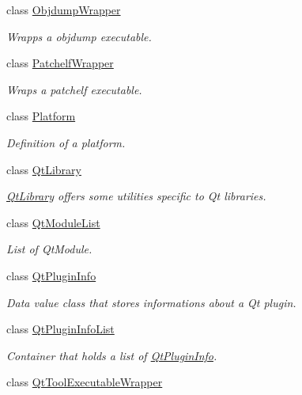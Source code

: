 \begin{DoxyCompactItemize}
class \hyperlink{class_mdt_1_1_deploy_utils_1_1_objdump_wrapper}{Objdump\+Wrapper}
\begin{DoxyCompactList}\small\item\em Wrapps a objdump executable. \end{DoxyCompactList}\item 
class \hyperlink{class_mdt_1_1_deploy_utils_1_1_patchelf_wrapper}{Patchelf\+Wrapper}
\begin{DoxyCompactList}\small\item\em Wraps a patchelf executable. \end{DoxyCompactList}\item 
class \hyperlink{class_mdt_1_1_deploy_utils_1_1_platform}{Platform}
\begin{DoxyCompactList}\small\item\em Definition of a platform. \end{DoxyCompactList}\item 
class \hyperlink{class_mdt_1_1_deploy_utils_1_1_qt_library}{Qt\+Library}
\begin{DoxyCompactList}\small\item\em \hyperlink{class_mdt_1_1_deploy_utils_1_1_qt_library}{Qt\+Library} offers some utilities specific to Qt libraries. \end{DoxyCompactList}\item 
class \hyperlink{class_mdt_1_1_deploy_utils_1_1_qt_module_list}{Qt\+Module\+List}
\begin{DoxyCompactList}\small\item\em List of Qt\+Module. \end{DoxyCompactList}\item 
class \hyperlink{class_mdt_1_1_deploy_utils_1_1_qt_plugin_info}{Qt\+Plugin\+Info}
\begin{DoxyCompactList}\small\item\em Data value class that stores informations about a Qt plugin. \end{DoxyCompactList}\item 
class \hyperlink{class_mdt_1_1_deploy_utils_1_1_qt_plugin_info_list}{Qt\+Plugin\+Info\+List}
\begin{DoxyCompactList}\small\item\em Container that holds a list of \hyperlink{class_mdt_1_1_deploy_utils_1_1_qt_plugin_info}{Qt\+Plugin\+Info}. \end{DoxyCompactList}\item 
class \hyperlink{class_mdt_1_1_deploy_utils_1_1_qt_tool_executable_wrapper}{Qt\+Tool\+Executable\+Wrapper}

\end{DoxyCompactItemize}
